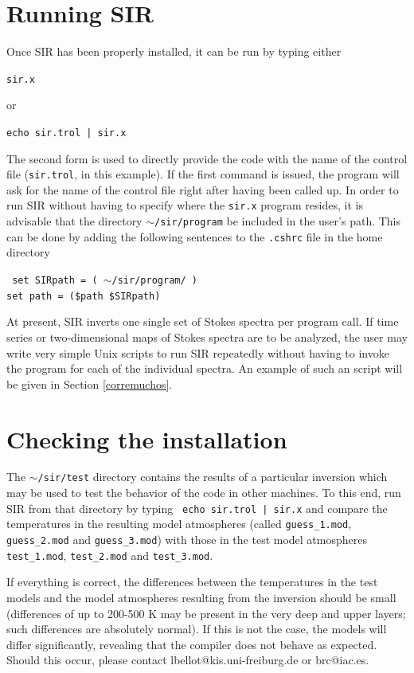 \documentclass[11pt]{report}
\begin{document}
\section{Running SIR}
Once SIR has been properly installed, it can be run by typing either 
\begin{flushleft}
{\tt sir.x}
\end{flushleft}
 or 
\begin{flushleft}
{\tt echo sir.trol | sir.x} 
\end{flushleft} 
The second form is used to directly provide the code with the name of
the control file ({\tt sir.trol}, in this example). If the first
command is issued, the program will ask for the name of the control
file right after having been called up. In order to run SIR without
having to specify where the {\tt sir.x} program resides, it is
advisable that the directory {\tt $\sim$/sir/program} be included in the
user's path. This can be done by adding the following sentences to the
{\tt .cshrc} file in the home directory
\begin{flushleft}
\tt
set SIRpath    = ( $\sim$/sir/program/ ) \\
set path    = (\$path \$SIRpath)
\end{flushleft}

At present, SIR inverts one single set of Stokes spectra per program 
call. If time series or two-dimensional maps of Stokes spectra are to 
be analyzed, the user may write very simple Unix scripts to run SIR 
repeatedly without having to invoke the program for each of the 
individual spectra. An example of such an script will be given 
in Section \ref{corremuchos}.

\section{Checking the installation}
The {\tt $\sim$/sir/test} directory contains the results of a particular
inversion which may be used to test the behavior of the code in other
machines. To this end, run SIR from that directory by typing {\tt 
echo sir.trol | sir.x} and compare the temperatures in the resulting 
model atmospheres (called {\tt guess\_1.mod}, {\tt guess\_2.mod} and 
{\tt guess\_3.mod}) with those in the test model atmospheres 
{\tt test\_1.mod}, {\tt test\_2.mod} and {\tt test\_3.mod}. 

If everything is correct, the differences between the temperatures
in the test models and the model atmospheres resulting from the
inversion should be small (differences of up to 200-500 K may be
present in the very deep and upper layers; such differences are
absolutely normal). If this is not the case, the models will differ 
significantly, revealing that the compiler does not behave as 
expected. Should this occur, please contact 
lbellot@kis.uni-freiburg.de or brc@iac.es.  
\end{document}
